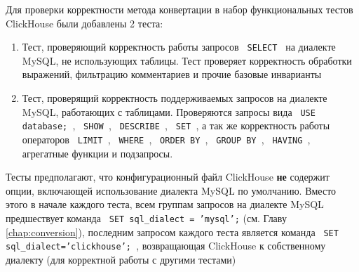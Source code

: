 Для проверки корректности метода конвертации в набор функциональных тестов ClickHouse были добавлены 2 теста:
\begin{enumerate}
    \item Тест, проверяющий корректность работы запросов \texttt{ SELECT } на диалекте MySQL, не использующих таблицы. Тест проверяет корректность обработки выражений, фильтрацию комментариев и прочие базовые инварианты
    \item Тест, проверящий корректность поддерживаемых запросов на диалекте MySQL, работающих с таблицами. Проверяются запросы вида \texttt{ USE database; }, \texttt{ SHOW }, \texttt{ DESCRIBE }, \texttt{ SET }, а так же корректность работы операторов \texttt{ LIMIT }, \texttt{ WHERE }, \texttt{ ORDER BY }, \texttt{ GROUP BY }, \texttt{ HAVING }, агрегатные функции и подзапросы.
\end{enumerate}

Тесты предполагают, что конфигурационный файл ClickHouse \textbf{не} содержит опции, включающей использование диалекта MySQL по умолчанию. Вместо этого в начале каждого теста, всем группам запросов на диалекте MySQL предшествует команда \texttt{ SET sql_dialect = 'mysql';} (см. Главу \ref{chap:conversion}), последним запросом каждого теста является команда \texttt{ SET sql_dialect='clickhouse'; }, возвращающая ClickHouse к собственному диалекту (для корректной работы с другими тестами)

\pagebreak
